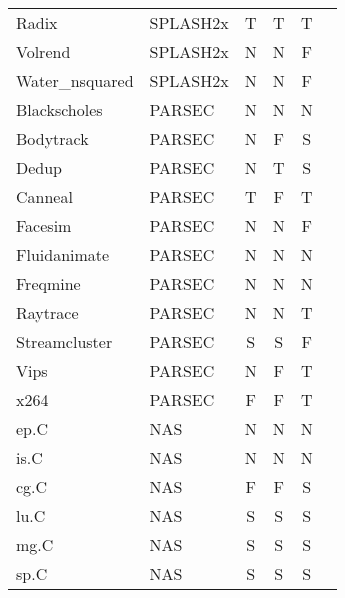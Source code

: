 \begin{landscape}
\begin{table}[htb]
{\begin{tabular}{@{}ll ccc c@{}}
             Radix       & SPLASH2x& T       & T     & T \\
             Volrend     & SPLASH2x& N       & N     & F \\
            Water\_nsquared& SPLASH2x& N     & N     & F \\
             Blackscholes& PARSEC  & N       & N     & N \\
             Bodytrack   & PARSEC  & N       & F     & S \\
             Dedup       & PARSEC  & N       & T     & S \\
             Canneal     & PARSEC  & T       & F     & T \\
                                                                                                              
             Facesim     & PARSEC  & N       & N     & F \\
             Fluidanimate& PARSEC  & N       & N     & N \\
             Freqmine    & PARSEC  & N       & N     & N \\                                                  
             Raytrace    & PARSEC  & N       & N     & T \\
            Streamcluster& PARSEC  & S      & S     & F \\
             Vips        & PARSEC  & N       & F     & T \\
             x264        & PARSEC  & F       & F     & T \\
             ep.C        & NAS     & N       & N     & N \\
             is.C        & NAS     & N       & N     & N \\
             cg.C        & NAS     & F       & F     & S \\
             lu.C        & NAS     & S       & S     & S \\  
             mg.C        & NAS     & S       & S     & S \\  
             sp.C        & NAS     & S       & S     & S \\  

        \bottomrule
        \end{tabular}
    }
    \label{tab: classes}
    \end{table}
\end{landscape} 
